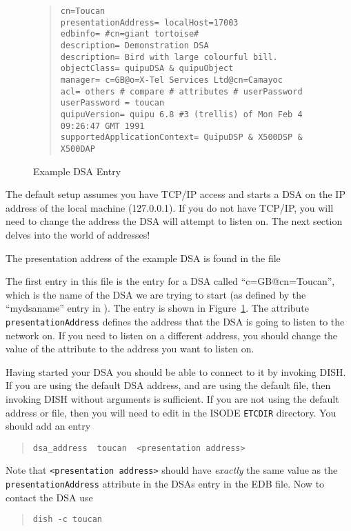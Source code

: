 \begin{figure}
\smaller
\center
\begin{quote}\begin{verbatim}
cn=Toucan
presentationAddress= localHost=17003
edbinfo= #cn=giant tortoise#
description= Demonstration DSA
description= Bird with large colourful bill.
objectClass= quipuDSA & quipuObject
manager= c=GB@o=X-Tel Services Ltd@cn=Camayoc
acl= others # compare # attributes # userPassword
userPassword = toucan
quipuVersion= quipu 6.8 #3 (trellis) of Mon Feb 4 09:26:47 GMT 1991
supportedApplicationContext= QuipuDSP & X500DSP & X500DAP
\end{verbatim}\end{quote}
\caption{Example DSA Entry}
\label{DSA:Toucan}
\end{figure}

The default setup assumes you have TCP/IP access and starts a DSA on the IP
address of the local machine (127.0.0.1).  If you do not have TCP/IP, you
will need to change the address the DSA will attempt to listen on. The
next section delves into the world of addresses!

The presentation address of the example DSA is found in the file
\begin{quote}
\end{quote}
The first entry in this file is the entry for a DSA called
``c=GB@cn=Toucan'', which is the name of the DSA we are trying to start (as
defined by the ``mydsaname'' entry in ).
The entry is shown in Figure~\ref{DSA:Toucan}.
The attribute \verb"presentationAddress" defines the address that the DSA is
going to listen to the network on.
If you need to listen on a different address, you should change the value of
the attribute to the address you want to listen on.

Having started your DSA you should be able to connect to it by
invoking DISH. If you are using the default DSA address, and are
using the default  file, then invoking DISH
without arguments is sufficient.
If you are not using the default address or  file, then you
will need to edit  in the ISODE \verb"ETCDIR" directory.
You should add an entry
\begin{quote}\begin{verbatim}
dsa_address  toucan  <presentation address>
\end{verbatim}\end{quote}
Note that \verb+<presentation address>+ should have {\em exactly} the same
value as 
the \verb+presentationAddress+ attribute in the DSAs entry in the EDB file.
Now to contact the DSA use
\begin{quote}\begin{verbatim}
dish -c toucan
\end{verbatim}\end{quote}


